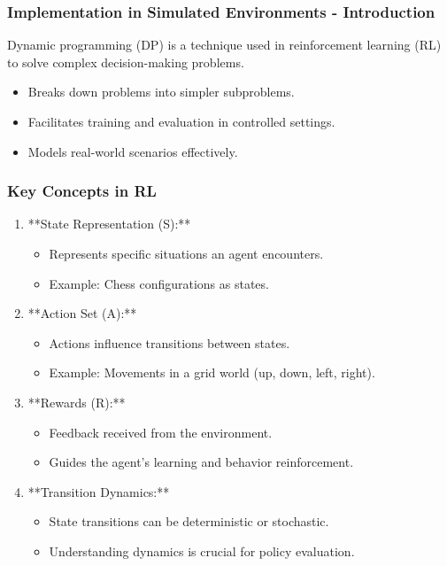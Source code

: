 \documentclass[aspectratio=169]{beamer}
\begin{document}
\begin{frame}[fragile]
    \frametitle{Implementation in Simulated Environments - Introduction}
    Dynamic programming (DP) is a technique used in reinforcement learning (RL) to solve complex decision-making problems.
    
    \begin{itemize}
        \item Breaks down problems into simpler subproblems.
        \item Facilitates training and evaluation in controlled settings.
        \item Models real-world scenarios effectively.
    \end{itemize}
\end{frame}

\begin{frame}[fragile]
    \frametitle{Key Concepts in RL}
    \begin{enumerate}
        \item **State Representation (S):**
            \begin{itemize}
                \item Represents specific situations an agent encounters.
                \item Example: Chess configurations as states.
            \end{itemize}
        
        \item **Action Set (A):**
            \begin{itemize}
                \item Actions influence transitions between states.
                \item Example: Movements in a grid world (up, down, left, right).
            \end{itemize}

        \item **Rewards (R):**
            \begin{itemize}
                \item Feedback received from the environment.
                \item Guides the agent's learning and behavior reinforcement.
            \end{itemize}
        
        \item **Transition Dynamics:**
            \begin{itemize}
                \item State transitions can be deterministic or stochastic.
                \item Understanding dynamics is crucial for policy evaluation.
            \end{itemize}
    \end{enumerate}
\end{frame}
\end{document}
